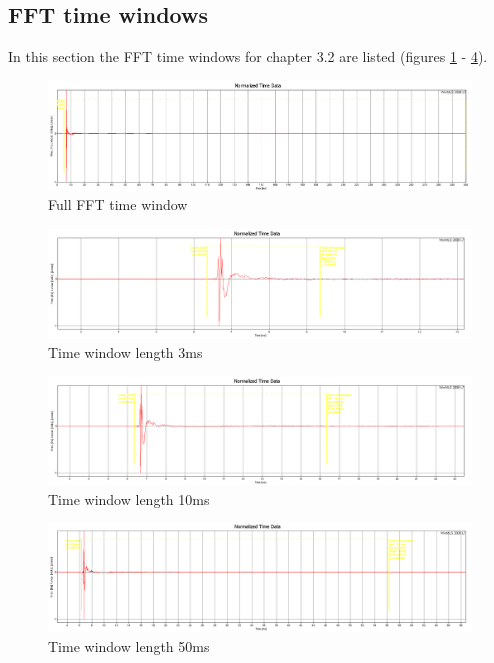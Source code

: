 \documentclass{article}
\begin{document}
\subsection{FFT time windows}
In this section the FFT time windows for chapter 3.2 are listed (figures \ref{fig:TaskAtimecomplete} - \ref{fig:TaskAtime50ms}).
\begin{figure}[htbp]
\begin{center}
\includegraphics[width=15cm,keepaspectratio=true]{Figures/TaskAtimecomplete}
\caption{Full FFT time window}
\label{fig:TaskAtimecomplete}
\end{center}
\end{figure}
\begin{figure}[htbp]
\begin{center}
\includegraphics[width=15cm,keepaspectratio=true]{Figures/TaskAtime3ms}
\caption{Time window length 3ms}
\label{fig:TaskAtime3ms}
\end{center}
\end{figure}
\begin{figure}[htbp]
\begin{center}
\includegraphics[width=15cm,keepaspectratio=true]{Figures/TaskAtime10ms}
\caption{Time window length 10ms}
\label{fig:TaskAtime10ms}
\end{center}
\end{figure}
\begin{figure}[htbp]
\begin{center}
\includegraphics[width=15cm,keepaspectratio=true]{Figures/TaskAtime50ms}
\caption{Time window length 50ms}
\label{fig:TaskAtime50ms}
\end{center}
\end{figure}
\clearpage
\end{document}
